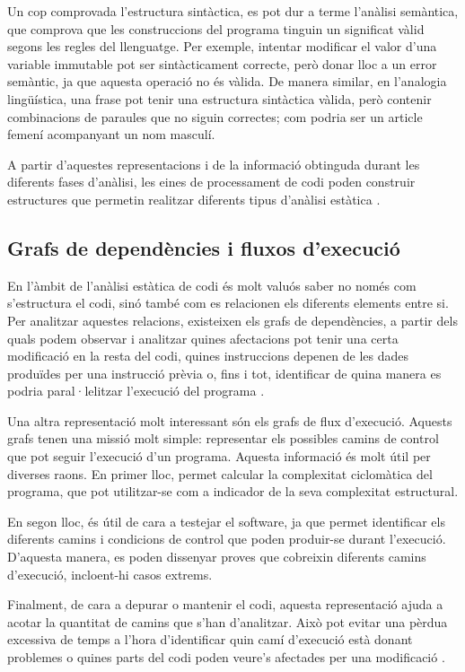 Un cop comprovada l'estructura sintàctica, es pot dur a terme l'anàlisi se\-màntica, que comprova que les construccions del programa tinguin un significat vàlid segons les regles del llenguatge. Per exemple, intentar modificar el valor d'una variable immutable pot ser sintàcticament correcte, però donar lloc a un error semàntic, ja que aquesta operació no és vàlida. De manera similar, en l'analogia lingüística, una frase pot tenir una estructura sintàctica vàlida, però contenir combinacions de paraules que no siguin correctes; com podria ser un article femení acompanyant un nom masculí.

A partir d'aquestes representacions i de la informació obtinguda durant les diferents fases d'anàlisi, les eines de processament de codi poden construir estructures que permetin realitzar diferents tipus d'anàlisi estàtica \cite{clang_llvm}\cite{balapriya_ast}.

\subsection*{Grafs de dependències i fluxos d'execució}
En l'àmbit de l'anàlisi estàtica de codi és molt valuós saber no només com s'estructura el codi, sinó també com es relacionen els diferents elements entre si. Per analitzar aquestes relacions, existeixen els grafs de dependències, a partir dels quals podem observar i analitzar quines afectacions pot tenir una certa modificació en la resta del codi, quines instruccions depenen de les dades produïdes per una instrucció prèvia o, fins i tot, identificar de quina manera es podria paral·lelitzar l'execució del programa \cite{gfg_dependencygraph}.

Una altra representació molt interessant són els grafs de flux d'execució. Aquests grafs tenen una missió molt simple: representar els possibles camins de control que pot seguir l'execució d'un programa. Aquesta informació és molt útil per diverses raons. En primer lloc, permet calcular la complexitat ciclomàtica del programa, que pot utilitzar-se com a indicador de la seva complexitat estructural.

En segon lloc, és útil de cara a testejar el software, ja que permet identificar els diferents camins i condicions de control que poden produir-se durant l'execució. D'aquesta manera, es poden dissenyar proves que cobreixin diferents camins d'execució, incloent-hi casos extrems.

Finalment, de cara a depurar o mantenir el codi, aquesta representació ajuda a acotar la quantitat de camins que s'han d'analitzar. Això pot evitar una pèrdua excessiva de temps a l'hora d'identificar quin camí d'execució està donant problemes o quines parts del codi poden veure's afectades per una modificació \cite{gfg_controlflowgraph}.

